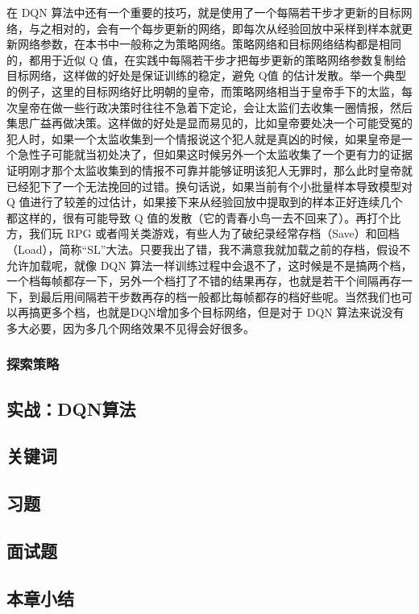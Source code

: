 在 DQN 算法中还有一个重要的技巧，就是使用了一个每隔若干步才更新的目标网络，与之相对的，会有一个每步更新的网络，即每次从经验回放中采样到样本就更新网络参数，在本书中一般称之为策略网络。策略网络和目标网络结构都是相同的，都用于近似 Q 值，在实践中每隔若干步才把每步更新的策略网络参数复制给目标网络，这样做的好处是保证训练的稳定，避免 Q值 的估计发散。举一个典型的例子，这里的目标网络好比明朝的皇帝，而策略网络相当于皇帝手下的太监，每次皇帝在做一些行政决策时往往不急着下定论，会让太监们去收集一圈情报，然后集思广益再做决策。这样做的好处是显而易见的，比如皇帝要处决一个可能受冤的犯人时，如果一个太监收集到一个情报说这个犯人就是真凶的时候，如果皇帝是一个急性子可能就当初处决了，但如果这时候另外一个太监收集了一个更有力的证据证明刚才那个太监收集到的情报不可靠并能够证明该犯人无罪时，那么此时皇帝就已经犯下了一个无法挽回的过错。换句话说，如果当前有个小批量样本导致模型对 Q 值进行了较差的过估计，如果接下来从经验回放中提取到的样本正好连续几个都这样的，很有可能导致 Q 值的发散（它的青春小鸟一去不回来了）。再打个比方，我们玩 RPG 或者闯关类游戏，有些人为了破纪录经常存档（Save）和回档（Load），简称“SL”大法。只要我出了错，我不满意我就加载之前的存档，假设不允许加载呢，就像 DQN 算法一样训练过程中会退不了，这时候是不是搞两个档，一个档每帧都存一下，另外一个档打了不错的结果再存，也就是若干个间隔再存一下，到最后用间隔若干步数再存的档一般都比每帧都存的档好些呢。当然我们也可以再搞更多个档，也就是DQN增加多个目标网络，但是对于 DQN 算法来说没有多大必要，因为多几个网络效果不见得会好很多。


\subsubsection{探索策略}
\subsection{实战：DQN算法}


\subsection{关键词}
\subsection{习题}
\subsection{面试题}
\subsection{本章小结}